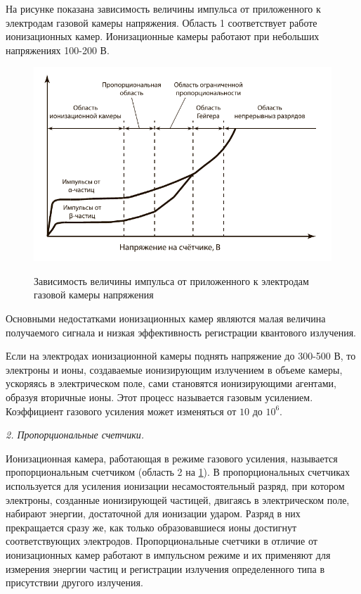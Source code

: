 \documentclass[14pt,pscyr,titlepage]{hedreport}
\begin{document}
		На рисунке показана зависимость величины импульса от приложенного к 
		электродам газовой камеры напряжения. Область 1 соответствует работе 
		ионизационных камер. Ионизационные камеры работают при небольших 
		напряжениях 100-200 В.

		\begin{figure}[h!]
			\center
			\includegraphics[width=.8\textwidth]{counter_graph} \\
			\caption{Зависимость величины импульса от приложенного к электродам 
				газовой камеры напряжения}
			\label{img:graph}
		\end{figure}

		Основными недостатками ионизационных камер являются малая величина 
		получаемого сигнала и низкая эффективность регистрации квантового 
		излучения.

		Если на электродах ионизационной камеры поднять напряжение до 
		300-500 В, то электроны и ионы, создаваемые ионизирующим излучением в 
		объеме камеры, ускоряясь в электрическом поле, сами становятся 
		ионизирующими агентами, образуя вторичные ионы. Этот процесс 
		называется газовым усилением. Коэффициент газового усиления может 
		изменяться от \( 10 \) до \( 10^6 \).

		\emph{2. Пропорциональные счетчики. }

		Ионизационная камера, работающая в режиме газового усиления, 
		называется пропорциональным счетчиком (область 2 на \ref{img:graph}). 
		В пропорциональных счетчиках используется для усиления ионизации 
		несамостоятельный разряд, при котором электроны, созданные 
		ионизирующей частицей, двигаясь в электрическом поле, набирают 
		энергии, достаточной для ионизации ударом. Разряд в них прекращается 
		сразу же, как только образовавшиеся ионы достигнут соответствующих 
		электродов. Пропорциональные счетчики в отличие от ионизационных 
		камер работают в импульсном режиме и их применяют для измерения 
		энергии частиц и регистрации излучения определенного типа в 
		присутствии другого излучения.
\end{document}
